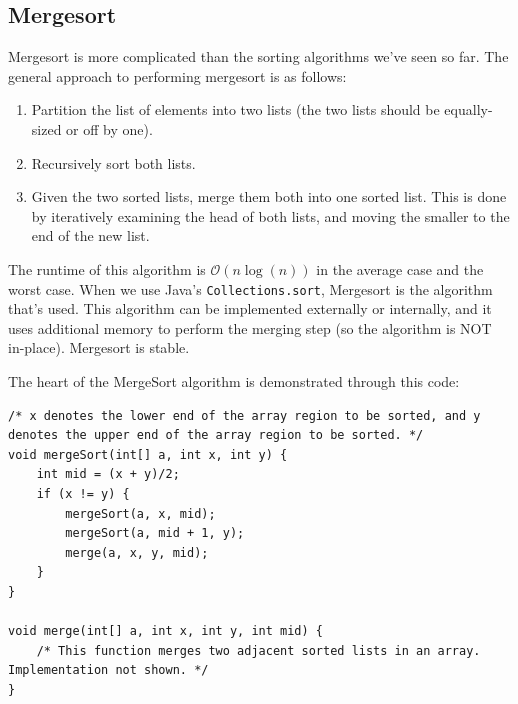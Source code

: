 \subsection{Mergesort}

Mergesort is more complicated than the sorting algorithms we've seen so far. The general approach to performing mergesort is as follows:

\begin{enumerate}
    \item Partition the list of elements into two lists (the two lists should be equally-sized or off by one).
    \item Recursively sort both lists. 
    \item Given the two sorted lists, merge them both into one sorted list. This is done by iteratively examining the head of both lists, and moving the smaller to the end of the new list. 
\end{enumerate}

The runtime of this algorithm is $\mathcal{O}(n\log(n))$ in the average case and the worst case. When we use Java's \verb!Collections.sort!, Mergesort is the algorithm that's used. This algorithm can be implemented externally or internally, and it uses additional memory to perform the merging step (so the algorithm is NOT in-place). Mergesort is stable. 

The heart of the MergeSort algorithm is demonstrated through this code:

\begin{lstlisting}
/* x denotes the lower end of the array region to be sorted, and y denotes the upper end of the array region to be sorted. */
void mergeSort(int[] a, int x, int y) {
    int mid = (x + y)/2;
    if (x != y) {
        mergeSort(a, x, mid);
        mergeSort(a, mid + 1, y);
        merge(a, x, y, mid);
    }
}

void merge(int[] a, int x, int y, int mid) {
    /* This function merges two adjacent sorted lists in an array. Implementation not shown. */
}
\end{lstlisting}
